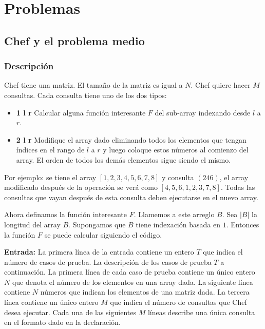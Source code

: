 \documentclass[12pt]{article}
\newcommand{\nl}{\vspace{0.3cm}}
\begin{document}
\newpage

\section{Problemas}

\subsection{Chef y el problema medio}

\subsubsection{Descripción}

Chef tiene una matriz. El tamaño de la matriz es igual a $N$. Chef quiere hacer $M$ consultas. Cada consulta tiene uno de los dos tipos:

\begin{itemize}
	\item \textbf{1 l r} Calcular alguna función interesante $F$ del sub-array indexando desde $l$ a $r$.
	\item \textbf{2 l r} Modifique el array dado eliminando todos los elementos que tengan índices en el rango de $l$ a $r$ y luego coloque estos números al comienzo del array. El orden de todos los demás elementos sigue siendo el mismo.
\end{itemize}

Por ejemplo: se tiene el array $[1, 2, 3, 4, 5, 6, 7, 8]$ y consulta $(2 4 6)$, el array modificado después de la operación se verá como $[4, 5, 6, 1, 2 , 3, 7, 8]$. Todas las consultas que vayan después de esta consulta deben ejecutarse en el nuevo array.

\nl

Ahora definamos la función interesante $F$. Llamemos a este arreglo $B$. Sea $|B|$ la longitud del array $B$. Supongamos que $B$ tiene indexación basada en $1$. Entonces la función $F$ se puede calcular siguiendo el código.



\nl

\textbf{Entrada:} La primera línea de la entrada contiene un entero $T$ que indica el número de casos de prueba. La descripción de los casos de prueba $T$ a continuación. La primera línea de cada caso de prueba contiene un único entero $N$ que denota el número de los elementos en una array dada. La siguiente línea contiene $N$ números que indican los elementos de una matriz dada. La tercera línea contiene un único entero $M$ que indica el número de consultas que Chef desea ejecutar. Cada una de las siguientes $M$ líneas describe una única consulta en el formato dado en la declaración.
\end{document}
